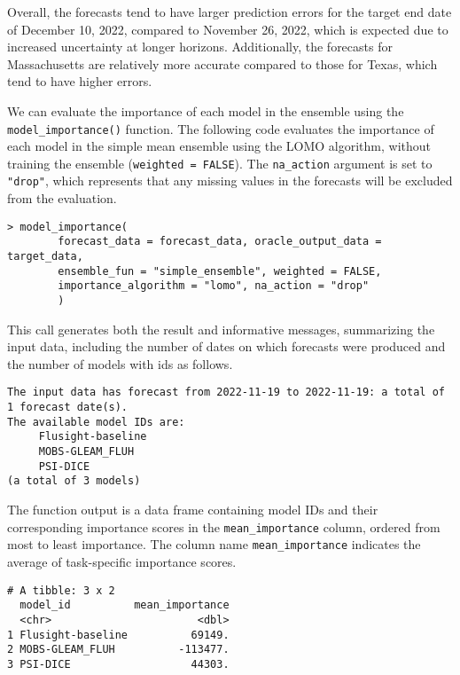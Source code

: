 \documentclass[
  article,
  shortnames,
  notitle]{jss}
\begin{document}
Overall, the forecasts tend to have larger prediction errors for the
target end date of December 10, 2022, compared to November 26, 2022,
which is expected due to increased uncertainty at longer horizons.
Additionally, the forecasts for Massachusetts are relatively more
accurate compared to those for Texas, which tend to have higher errors.

\normalsize

We can evaluate the importance of each model in the ensemble using the
\texttt{model\_importance()} function. The following code evaluates the
importance of each model in the simple mean ensemble using the LOMO
algorithm, without training the ensemble (\texttt{weighted\ =\ FALSE}).
The \texttt{na\_action} argument is set to \texttt{"drop"}, which
represents that any missing values in the forecasts will be excluded
from the evaluation.

\begin{verbatim}
> model_importance(
        forecast_data = forecast_data, oracle_output_data = target_data,
        ensemble_fun = "simple_ensemble", weighted = FALSE,
        importance_algorithm = "lomo", na_action = "drop"
        )
\end{verbatim}

This call generates both the result and informative messages,
summarizing the input data, including the number of dates on which
forecasts were produced and the number of models with ids as follows.

\small

\begin{verbatim}
The input data has forecast from 2022-11-19 to 2022-11-19: a total of 1 forecast date(s).
The available model IDs are:
     Flusight-baseline
     MOBS-GLEAM_FLUH
     PSI-DICE 
(a total of 3 models)
\end{verbatim}

\normalsize

The function output is a data frame containing model IDs and their
corresponding importance scores in the \texttt{mean\_importance} column,
ordered from most to least importance. The column name
\texttt{mean\_importance} indicates the average of task-specific
importance scores.

\small

\begin{verbatim}
# A tibble: 3 x 2
  model_id          mean_importance
  <chr>                       <dbl>
1 Flusight-baseline          69149.
2 MOBS-GLEAM_FLUH          -113477.
3 PSI-DICE                   44303.
\end{verbatim}
\end{document}
